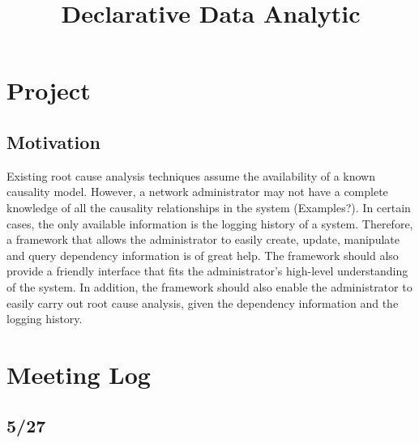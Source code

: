 \documentclass{article}
\begin{document}


\title{Declarative Data Analytic}
\author{}

\maketitle


\section{Project}
\label{sec:project}

\subsection{Motivation}
\label{sec:motiv}

Existing root cause analysis techniques assume the availability of a known
causality model. However, a network administrator may not have a complete
knowledge of all the causality relationships in the system (Examples?). In
certain cases, the only available information is the logging history of a
system. Therefore, a framework that allows the administrator to easily
create, update, manipulate and query dependency information is of great help. The
framework should also provide a friendly interface that fits the administrator's
high-level understanding of the system. In addition, the framework should also
enable the administrator to easily carry out root cause analysis, given the
dependency information and the logging history.



\section{Meeting Log}
\label{sec:meetlog}

\subsection{5/27}
\end{document}
